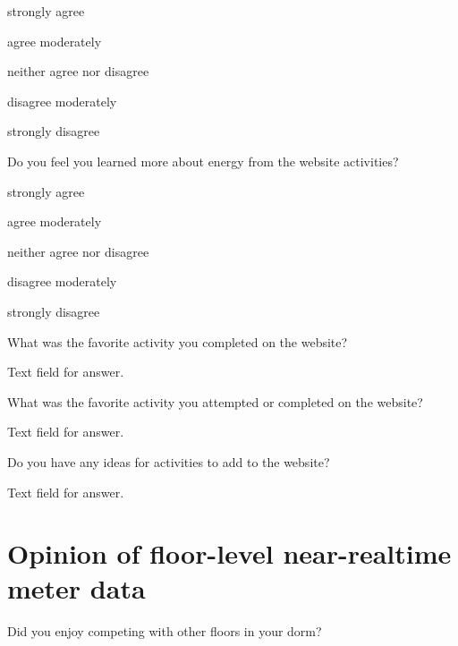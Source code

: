 \begin{answer}
	\item strongly agree
	\item agree moderately
	\item neither agree nor disagree
	\item disagree moderately
	\item strongly disagree
\end{answer}

\begin{question}
	\item Do you feel you learned more about energy from the website activities?
\end{question}

\begin{answer}
	\item strongly agree
	\item agree moderately
	\item neither agree nor disagree
	\item disagree moderately
	\item strongly disagree
\end{answer}

\begin{question}
	\item What was the favorite activity you completed on the website?
\end{question}

Text field for answer.

\begin{question}
	\item What was the favorite activity you attempted or completed on the website?
\end{question}

Text field for answer.

\begin{question}
	\item Do you have any ideas for activities to add to the website?
\end{question}

Text field for answer.

\section{Opinion of floor-level near-realtime meter data}

\begin{question}
	\item Did you enjoy competing with other floors in your dorm?
\end{question}

